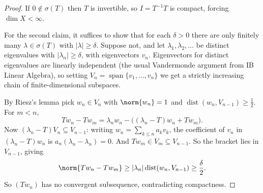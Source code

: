 \documentclass[a4paper]{scrartcl}
\newcommand{\spn}{\operatorname{span}}
\DeclareMathOperator{\dist}{dist}
\begin{document}
\begin{proof}
	If $0\notin\sigma(T)$ then $T$ is invertible, so $I = T^{-1}T$ is compact, forcing $\dim X<\infty$.

	For the second claim, it suffices to show that for each $\delta>0$ there are only finitely many $\lambda\in\sigma(T)$ with $|\lambda|\geq\delta$. Suppose not, and let $\lambda_1,\lambda_2,\dots$ be distinct eigenvalues with $|\lambda_n|\geq\delta$, with eigenvectors $v_n$. Eigenvectors for distinct eigenvalues are linearly independent (the usual Vandermonde argument from IB Linear Algebra), so setting $V_n = \spn\{v_1,\dots,v_n\}$ we get a strictly increasing chain of finite-dimensional subspaces.

	By Riesz's lemma pick $w_n \in V_n$ with $\norm{w_n}=1$ and $\dist(w_n,V_{n-1})\geq\frac12$. For $m<n$,
	$$Tw_n - Tw_m = \lambda_n w_n - \big( (\lambda_n - T)w_n + Tw_m \big).$$
	Now $(\lambda_n - T)V_n\subseteq V_{n-1}$: writing $w_n = \sum_{k\leq n}a_kv_k$, the coefficient of $v_n$ in $(\lambda_n-T)w_n$ is $a_n(\lambda_n-\lambda_n)=0$. And $Tw_m\in V_m\subseteq V_{n-1}$. So the bracket lies in $V_{n-1}$, giving
	$$\norm{Tw_n - Tw_m}\geq|\lambda_n|\dist(w_n,V_{n-1})\geq\frac{\delta}{2}.$$
	So $(Tw_n)$ has no convergent subsequence, contradicting compactness.
\end{proof}

\begin{center}
\end{center}
\end{document}
